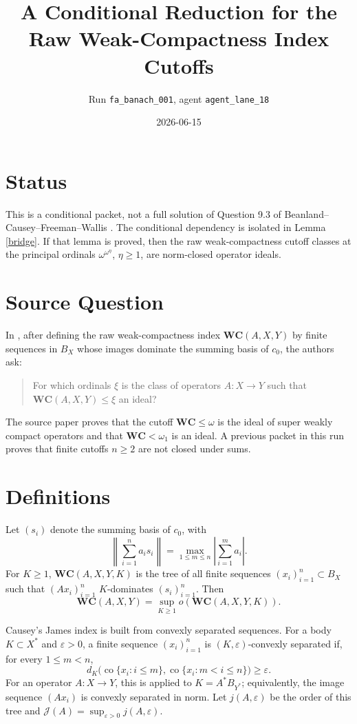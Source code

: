 \documentclass[11pt]{article}
\title{A Conditional Reduction for the Raw Weak-Compactness Index Cutoffs}
\author{Run \texttt{fa\_banach\_001}, agent \texttt{agent\_lane\_18}}
\date{2026-06-15}
\theoremstyle{definition}
\newcommand{\WC}{\mathbf{WC}}
\newcommand{\J}{\mathcal{J}}
\newcommand{\co}{\operatorname{co}}
\begin{document}
\maketitle

\section*{Status}

This is a conditional packet, not a full solution of Question 9.3 of
Beanland--Causey--Freeman--Wallis \cite{BCFW}.  The conditional dependency is
isolated in Lemma \ref{bridge}.  If that lemma is proved, then the raw
weak-compactness cutoff classes at the principal ordinals
$\omega^{\omega^\eta}$, $\eta\geq 1$, are norm-closed operator ideals.

\section{Source Question}

In \cite[Question 9.3]{BCFW}, after defining the raw weak-compactness index
$\WC(A,X,Y)$ by finite sequences in $B_X$ whose images dominate the summing
basis of $c_0$, the authors ask:

\begin{quote}
For which ordinals $\xi$ is the class of operators $A:X\to Y$ such that
$\WC(A,X,Y)\leq \xi$ an ideal?
\end{quote}

The source paper proves that the cutoff $\WC\leq\omega$ is the ideal of super
weakly compact operators and that $\WC<\omega_1$ is an ideal.  A previous
packet in this run proves that finite cutoffs $n\geq 2$ are not closed under
sums.

\section{Definitions}

Let $(s_i)$ denote the summing basis of $c_0$, with
\[
  \left\|\sum_{i=1}^n a_i s_i\right\|
  = \max_{1\leq m\leq n}\left|\sum_{i=1}^m a_i\right|.
\]
For $K\geq 1$, $\WC(A,X,Y,K)$ is the tree of all finite sequences
$(x_i)_{i=1}^n\subset B_X$ such that $(Ax_i)_{i=1}^n$ $K$-dominates
$(s_i)_{i=1}^n$.  Then
\[
  \WC(A,X,Y)=\sup_{K\geq 1} o(\WC(A,X,Y,K)).
\]

Causey's James index \cite{CauseyJ} is built from convexly separated
sequences.  For a body $K\subset X^*$ and $\varepsilon>0$, a finite sequence
$(x_i)_{i=1}^n$ is $(K,\varepsilon)$-convexly separated if, for every
$1\leq m<n$,
\[
 d_K\bigl(\co\{x_i:i\leq m\},\co\{x_i:m<i\leq n\}\bigr)\geq\varepsilon.
\]
For an operator $A:X\to Y$, this is applied to $K=A^*B_{Y^*}$; equivalently,
the image sequence $(Ax_i)$ is convexly separated in norm.  Let
$j(A,\varepsilon)$ be the order of this tree and
$\J(A)=\sup_{\varepsilon>0} j(A,\varepsilon)$.
\end{document}
